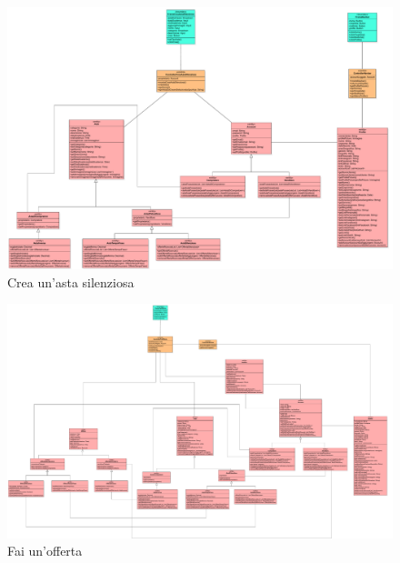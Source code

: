             \begin{figure}[htbp!]
                \centering
                    \includegraphics[width=1\linewidth]{Immagini/Diagrammi/Class Diagram/Venditore e compratore/CreaAstaSilenziosa.pdf}
                \caption{Crea un'asta silenziosa}
            \end{figure}
            
            \begin{figure}[htbp!]
                \centering
                    \includegraphics[width=1\linewidth]{Immagini/Diagrammi/Class Diagram/Venditore e compratore/FaiOfferta.pdf}
                \caption{Fai un'offerta}
            \end{figure}

    \clearpage
        
